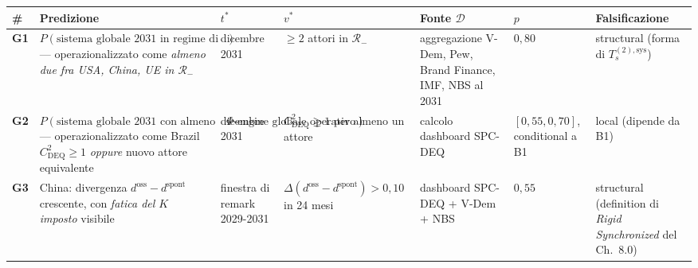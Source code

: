 {\def\LTcaptype{none} %
{\small\begin{longtable}[]{@{}
  >{\raggedright\arraybackslash}p{}
  >{\raggedright\arraybackslash}p{}
  >{\raggedright\arraybackslash}p{}
  >{\raggedright\arraybackslash}p{}
  >{\raggedright\arraybackslash}p{}
  >{\raggedright\arraybackslash}p{}
  >{\raggedright\arraybackslash}p{}@{}}
\toprule\noalign{}
\begin{minipage}[b]{\linewidth}\raggedright
\#
\end{minipage} & \begin{minipage}[b]{\linewidth}\raggedright
Predizione
\end{minipage} & \begin{minipage}[b]{\linewidth}\raggedright
\(t^*\)
\end{minipage} & \begin{minipage}[b]{\linewidth}\raggedright
\(v^*\)
\end{minipage} & \begin{minipage}[b]{\linewidth}\raggedright
Fonte \(\mathcal{D}\)
\end{minipage} & \begin{minipage}[b]{\linewidth}\raggedright
\(p\)
\end{minipage} & \begin{minipage}[b]{\linewidth}\raggedright
Falsificazione
\end{minipage} \\
\midrule\noalign{}
\endhead
\bottomrule\noalign{}
\endlastfoot
\textbf{G1} &
\(P(\text{sistema globale 2031 in regime di decoerenza generalizzata})\)
--- operazionalizzato come \emph{almeno due fra USA, China, UE in
\(\mathcal{R}_-\)} & dicembre 2031 & \(\geq 2\) attori in
\(\mathcal{R}_-\) & aggregazione V-Dem, Pew, Brand Finance, IMF, NBS al
2031 & \(0{,}80\) & structural (forma di \(T_s^{(2),\text{sys}}\)) \\
\textbf{G2} &
\(P(\text{sistema globale 2031 con almeno un $\Phi$-engine globale operativo})\)
--- operazionalizzato come Brazil \(C_{\text{DEQ}}^2 \geq 1\)
\emph{oppure} nuovo attore equivalente & dicembre 2031 &
\(C_{\text{DEQ}}^2 \geq 1\) per almeno un attore & calcolo dashboard
SPC-DEQ & \([0{,}55, 0{,}70]\), conditional a B1 & local (dipende da
B1) \\
\textbf{G3} & China: divergenza \(d^{\text{oss}} - d^{\text{spont}}\)
crescente, con \emph{fatica del \(K\) imposto} visibile & finestra di
remark 2029-2031 &
\(\Delta(d^{\text{oss}} - d^{\text{spont}}) > 0{,}10\) in 24 mesi &
dashboard SPC-DEQ + V-Dem + NBS & \(0{,}55\) & structural (definition
di \emph{Rigid Synchronized} del Ch.~8.0) \\
\end{longtable}}
}

